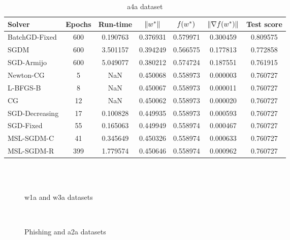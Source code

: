 \begin{table}
\caption{a4a dataset}
\label{tab:a4a-tab}
\centering
\begin{tabular}{lS[drop-zero-decimal]S[round-precision=4]S[round-precision=6]S[round-precision=6]S[exponent-mode=scientific]S[round-precision=6]}
\toprule
Solver & {Epochs} & {Run-time} & {$\lVert w^\ast\rVert$} & {$\operatorname*{\mathit{f}}(w^\ast)$} & {$\lVert\nabla f(w^\ast)\rVert$} & {Test score} \\
\midrule
BatchGD-Fixed & 600 & 0.190763 & 0.376931 & 0.579971 & 0.300459 & 0.809575 \\
SGDM & 600 & 3.501157 & 0.394249 & 0.566575 & 0.177813 & 0.772858 \\
SGD-Armijo & 600 & 5.049077 & 0.380212 & 0.574724 & 0.187551 & 0.761915 \\
Newton-CG & 5 & NaN & 0.450068 & 0.558973 & 0.000003 & 0.760727 \\
L-BFGS-B & 8 & NaN & 0.450067 & 0.558973 & 0.000011 & 0.760727 \\
CG & 12 & NaN & 0.450062 & 0.558973 & 0.000020 & 0.760727 \\
SGD-Decreasing & 17 & 0.100828 & 0.449935 & 0.558973 & 0.000593 & 0.760727 \\
SGD-Fixed & 55 & 0.165063 & 0.449949 & 0.558974 & 0.000467 & 0.760727 \\
MSL-SGDM-C & 41 & 0.345649 & 0.450326 & 0.558974 & 0.000633 & 0.760727 \\
MSL-SGDM-R & 399 & 1.779574 & 0.450646 & 0.558974 & 0.000962 & 0.760727 \\
\bottomrule
\end{tabular}
\end{table}

\begin{figure}
\centering
 \\
 \\
\caption[]{w1a and w3a datasets}
\label{fig:w1a-w3a}
\end{figure}

\begin{figure}
\centering
 \\
\caption[]{Phishing and a2a datasets}
\label{fig:phish-a2a}
\end{figure}

